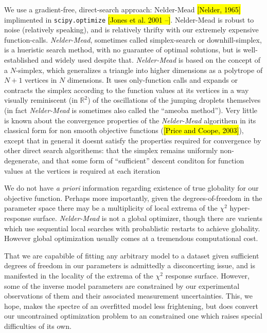 \documentclass[10pt,a4paper]{article}
\begin{document}
We use a gradient-free, direct-search approach: Nelder-Mead \hl{[Nelder, 1965]} implimented in \verb|scipy.optimize| \hl{[Jones et al. 2001 --]}. Nelder-Mead is robust to noise (relatively speaking), and is relatively thrifty with our extremely expensive function-calls. \emph{Nelder-Mead}, sometimes called simplex-search or downhill-simplex, is a hueristic search method, with no guarantee of optimal solutions, but is well-established and widely used despite that. \emph{Nelder-Mead} is based on the concept of a $N$-simplex, which generalizes a triangle into higher dimensions as a polytrope of $N + 1$ vertices in $N$ dimensions. It uses only-function calls and expands or contracts the simplex according to the function values at its vertices in a way visually reminiscent (in $\mathbb{R}^2$) of the oscillations of the jumping droplets themselves (in fact \emph{Nelder-Mead} is sometimes also called the ``ameoba method''). Very little is known about the convergence properties of the \emph{Nelder-Mead} algorithem in its classical form for non smooth objective functions (\hl{[Price and Coope, 2003]}), except that in general it doesnt satisfy the properties required for convergence by other direct search algorithems: that the simplex remains uniformly non-degenerate, and that some form of ``sufficient'' descent conditon for function values at the vertices is required at each iteration

We do not have \emph{a priori} information regarding existence of true globality for our objective function. Perhaps more importantly, given the degrees-of-freedom in the parameter space there may be a multiplicity of local extrema of the $\chi^2$ hyper-response surface. \emph{Nelder-Mead} is not a global optimizer, though there are varients which use sequential local searches with probablistic restarts to achieve globality. However global optimization usually comes at a tremendous computational cost.

That we are capabible of fitting any arbitrary model to a dataset given sufficient degrees of freedom in our parameters is admittedly a disconcerting issue, and is manifested in the locality of the extrema of the $\chi^2$ response surface. However, some of the inverse model parameters are constrained by our experimental observations of them and their associated measurement uncertainties. This, we hope, makes the spectre of an overfitted model less frightening, but does convert our uncontrained optimization problem to an constrained one which raises special difficulties of its own. 
\end{document}
